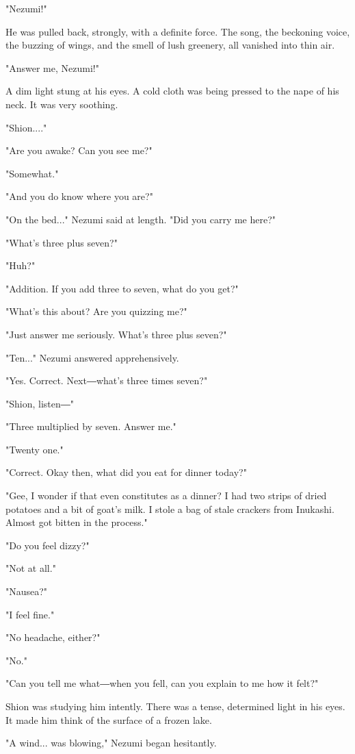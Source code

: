 "Nezumi!"

He was pulled back, strongly, with a definite force. The song, the
beckoning voice, the buzzing of wings, and the smell of lush greenery,
all vanished into thin air.

"Answer me, Nezumi!"

A dim light stung at his eyes. A cold cloth was being pressed to the
nape of his neck. It was very soothing.

"Shion...."

"Are you awake? Can you see me?"

"Somewhat."

"And you do know where you are?"

"On the bed..." Nezumi said at length. "Did you carry me here?"

"What's three plus seven?"

"Huh?"

"Addition. If you add three to seven, what do you get?"

"What's this about? Are you quizzing me?"

"Just answer me seriously. What's three plus seven?"

"Ten..." Nezumi answered apprehensively.

"Yes. Correct. Next―what's three times seven?"

"Shion, listen―"

"Three multiplied by seven. Answer me."

"Twenty one."

"Correct. Okay then, what did you eat for dinner today?"

"Gee, I wonder if that even constitutes as a dinner? I had two strips of
dried potatoes and a bit of goat's milk. I stole a bag of stale crackers
from Inukashi. Almost got bitten in the process."

"Do you feel dizzy?"

"Not at all."

"Nausea?"

"I feel fine."

"No headache, either?"

"No."

"Can you tell me what―when you fell, can you explain to me how it felt?"

Shion was studying him intently. There was a tense, determined light in
his eyes. It made him think of the surface of a frozen lake.

"A wind... was blowing," Nezumi began hesitantly.

